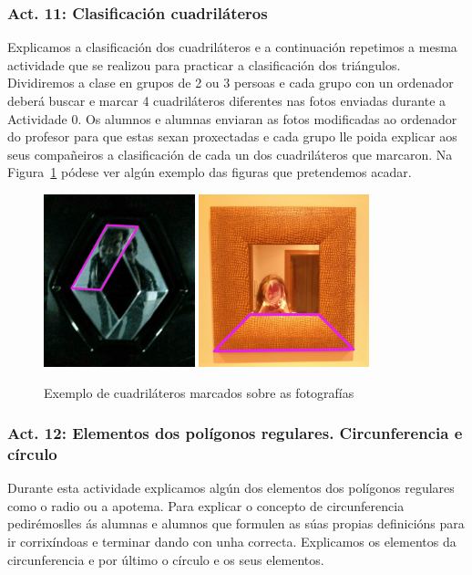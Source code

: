 \subsubsection{Act. 11: Clasificación cuadriláteros}\label{act11}
Explicamos a clasificación dos cuadriláteros e a continuación repetimos a mesma actividade que se realizou para practicar a clasificación dos triángulos.  Dividiremos a clase en grupos de 2 ou 3 persoas e cada grupo con un ordenador deberá buscar e marcar 4 cuadriláteros diferentes nas fotos enviadas durante a Actividade 0.
Os alumnos e alumnas enviaran as fotos modificadas ao ordenador do profesor para que estas sexan proxectadas e cada grupo lle poida explicar aos seus compañeiros a clasificación de cada un dos cuadriláteros que marcaron. Na Figura~\ref{fig:act11} pódese ver algún exemplo das figuras que pretendemos acadar.

\begin{figure}[h!]
  \centering
  \includegraphics[height=5cm]{img/cuad1.jpg}
  \includegraphics[height=5cm]{img/cuad2.jpg}
  \caption{Exemplo de cuadriláteros marcados sobre as fotografías}\label{fig:act11}
\end{figure}

\subsubsection{Act. 12: Elementos dos polígonos regulares. Circunferencia e círculo} %
Durante esta actividade explicamos algún dos elementos dos polígonos regulares como o radio ou a apotema. Para explicar o concepto de circunferencia pedirémoslles ás alumnas e alumnos que formulen as súas propias definicións para ir corrixíndoas e terminar dando con unha correcta. Explicamos os elementos da circunferencia e por último o círculo e os seus elementos.

